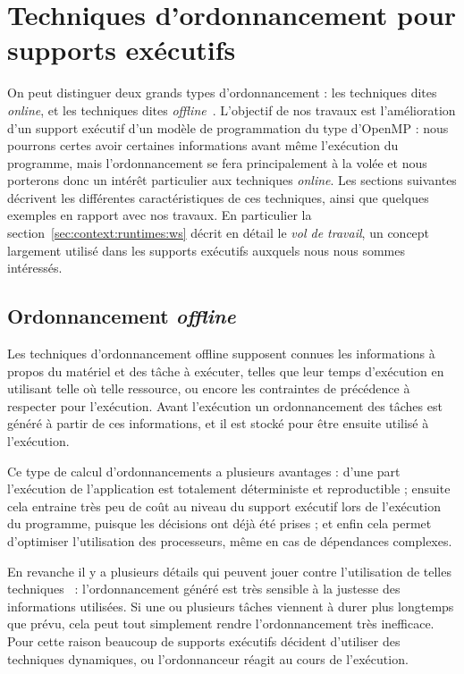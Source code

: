 \section{Techniques d'ordonnancement pour supports exécutifs}\label{sec:context:runtimes}

On peut distinguer deux grands types d'ordonnancement : les techniques dites \emph{online}, et les techniques dites \emph{offline}~\cite{Karp1992}.
L'objectif de nos travaux est l'amélioration d'un support exécutif d'un modèle de programmation du type d'OpenMP : nous pourrons certes avoir certaines informations avant même l'exécution du programme, mais l'ordonnancement se fera principalement à la volée et nous porterons donc un intérêt particulier aux techniques \emph{online}.
Les sections suivantes décrivent les différentes caractéristiques de ces techniques, ainsi que quelques exemples en rapport avec nos travaux.
En particulier la section~\ref{sec:context:runtimes:ws} décrit en détail le \emph{vol de travail}, un concept largement utilisé dans les supports exécutifs auxquels nous nous sommes intéressés.

\subsection{Ordonnancement \emph{offline}}

Les techniques d'ordonnancement offline supposent connues les informations à propos du matériel et des tâche à exécuter, telles que leur temps d'exécution en utilisant telle où telle ressource, ou encore les contraintes de précédence à respecter pour l'exécution.
Avant l'exécution un ordonnancement des tâches est généré à partir de ces informations, et il est stocké pour être ensuite utilisé à l'exécution.

Ce type de calcul d'ordonnancements a plusieurs avantages : d'une part l'exécution de l'application est totalement déterministe et reproductible ; ensuite cela entraine très peu de coût au niveau du support exécutif lors de l'exécution du programme, puisque les décisions ont déjà été prises ; et enfin cela permet d'optimiser l'utilisation des processeurs, même en cas de dépendances complexes.

En revanche il y a plusieurs détails qui peuvent jouer contre l'utilisation de telles techniques~\cite{Locke1992} : l'ordonnancement généré est très sensible à la justesse des informations utilisées. Si une ou plusieurs tâches viennent à durer plus longtemps que prévu, cela peut tout simplement rendre l'ordonnancement très inefficace.
Pour cette raison beaucoup de supports exécutifs décident d'utiliser des techniques dynamiques, ou l'ordonnanceur réagit au cours de l'exécution.

